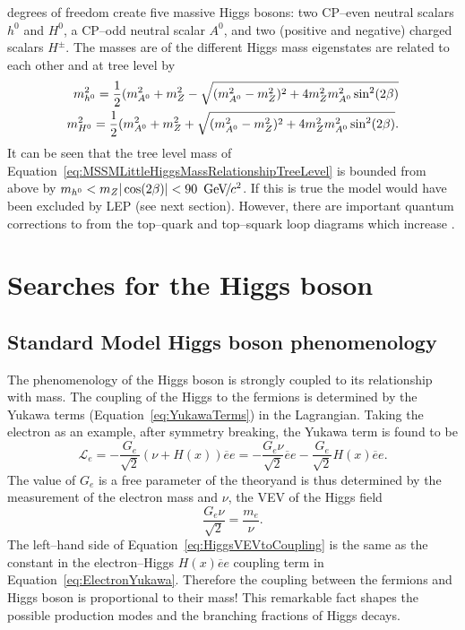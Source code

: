 degrees of freedom create five massive Higgs bosons: two CP--even neutral
scalars $h^0$ and $H^0$, a CP--odd neutral scalar $A^0$, and two (positive and
negative) charged scalars $H^\pm$.  The masses are of the different Higgs mass
eigenstates are related to each other and \tanb at tree level by
\begin{eqnarray}
  m_{h^0}^2 = \frac{1}{2}(m_{A^0}^2 + m_Z^2 - \sqrt{
  (m_{A^0}^2 - m_Z^2)^2 + 4m_Z^2m_{A^0}^2\sin^2(2\beta)} 
  \label{eq:MSSMLittleHiggsMassRelationshipTreeLevel} \\
  m_{H^0}^2 = \frac{1}{2}(m_{A^0}^2 + m_Z^2 + \sqrt{
  (m_{A^0}^2 - m_Z^2)^2 + 4m_Z^2m_{A^0}^2\sin^2(2\beta)}. 
  \label{eq:MSSMHiggs0MassRelationshipTreeLevel}
\end{eqnarray}
It can be seen that the tree level mass \mhZero of
Equation~\ref{eq:MSSMLittleHiggsMassRelationshipTreeLevel} is bounded from above
by $m_{h^0} < m_Z|\cos(2\beta)| < 90~{\,\text{Ge\hspace{-.08em}V\hspace{-0.16em}/\hspace{-0.08em}}c^\text{2}}$.  If this is true the
model would have been excluded by LEP (see next section).  However, there are
important quantum corrections to \mhZero from the top--quark and top--squark
loop diagrams which increase \mhZero.  


\section{Searches for the Higgs boson}
\subsection{Standard Model Higgs boson phenomenology}
\label{sec:SMHiggsPhenom}
The phenomenology of the Higgs boson is strongly coupled to its relationship
with mass.  The coupling of the Higgs to the fermions is determined by the
Yukawa terms (Equation~\ref{eq:YukawaTerms}) in the Lagrangian.  Taking the
electron as an example, after symmetry breaking, the Yukawa term is found to be 
\begin{equation}
  \mathcal{L}_e = -\frac{G_e}{\sqrt 2} (\nu + H(x)) \overline e e = 
  - \frac{G_e \nu}{\sqrt 2} \overline e e - \frac{G_e}{\sqrt 2}
  H(x) \overline e e.
  \label{eq:ElectronYukawa}
\end{equation}
The value of $G_e$ is a free parameter of the theoryand is thus determined by
the measurement of the electron mass and $\nu$, the VEV of the Higgs field
\begin{equation}
  \frac{G_e \nu}{\sqrt 2} = \frac{m_e}{\nu}.
  \label{eq:HiggsVEVtoCoupling}
\end{equation}
The left--hand side of Equation~\ref{eq:HiggsVEVtoCoupling} is the same as the
constant in the electron--Higgs $H(x)\overline e e$ coupling term in
Equation~\ref{eq:ElectronYukawa}.  Therefore the coupling between the fermions
and Higgs boson is proportional to their mass!  This remarkable fact shapes the
possible production modes and the branching fractions of Higgs decays.

